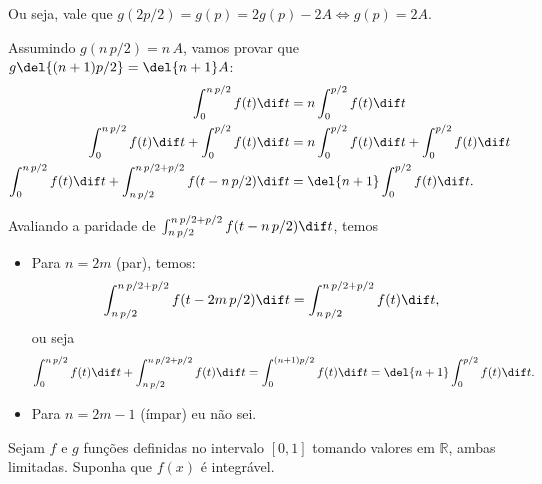 \documentclass{IMTexam}
\begin{document}
\begin{questions}
\begin{enumerate}
\begin{solution}
				Ou seja, vale que $ g(2p/2)=g(p)=2g(p)-2A\iff g(p)=2A $.
				
				Assumindo $ g(n\,p/2)=n\,A $, vamos provar que $ g\del{(n+1)p/2}=\del{n+1}A $:
				\begin{align*}
					\int_{0}^{n\,p/2}f(t)\dif t&=n\int_{0}^{p/2}f(t)\dif t\\
					\int_{0}^{n\,p/2}f(t)\dif t+\int_{0}^{p/2}f(t)\dif t&=n\int_{0}^{p/2}f(t)\dif t+\int_{0}^{p/2}f(t)\dif t\\
					\int_{0}^{n\,p/2}f(t)\dif t+\int_{n\,p/2}^{n\,p/2+p/2}f(t-n\,p/2)\dif t&=\del{n+1}\int_{0}^{p/2}f(t)\dif t.
				\end{align*}
				
				Avaliando a paridade de $ \int_{n\,p/2}^{n\,p/2+p/2}f(t-n\,p/2)\dif t $, temos
				\begin{itemize}
					\item Para $ n=2m $ (par), temos:
					\[ \int_{n\,p/2}^{n\,p/2+p/2}f(t-2m\,p/2)\dif t=\int_{n\,p/2}^{n\,p/2+p/2}f(t)\dif t, \]
					ou seja
					\[ \int_{0}^{n\,p/2}f(t)\dif t+\int_{n\,p/2}^{n\,p/2+p/2}f(t)\dif t=\int_{0}^{(n+1)p/2}f(t)\dif t=\del{n+1}\int_{0}^{p/2}f(t)\dif t. \]
					\hfill\qedsymbol
					\item Para $ n=2m-1 $ (ímpar) eu não sei.
				\end{itemize}
			\end{solution}
		\end{enumerate}
	
		\question Sejam $ f $ e $ g $ funções definidas no intervalo $ [0, 1] $ tomando valores em $ \mathbb{R} $, ambas limitadas. Suponha que $ f (x) $ é integrável.
		

\end{questions}
\end{document}
